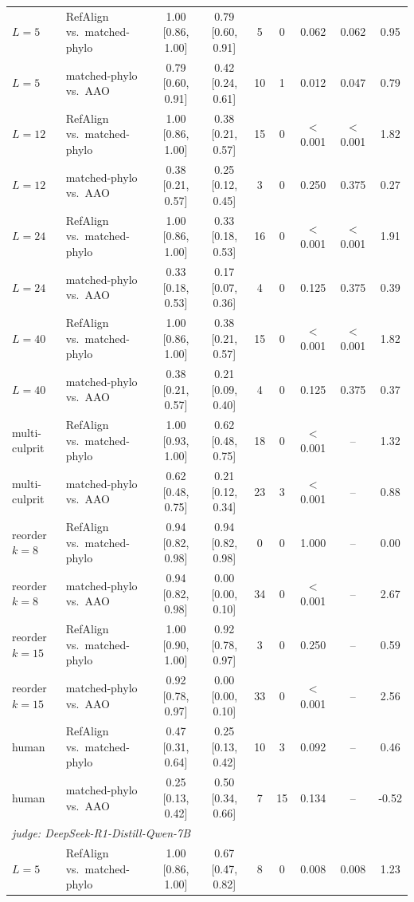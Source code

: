\begin{table}[t]
\begin{tabular}{llccccccc}
$L{=}5$ & RefAlign vs.\ matched-phylo & 1.00 [0.86, 1.00] & 0.79 [0.60, 0.91] & 5 & 0 & 0.062 & 0.062 & 0.95 \\
$L{=}5$ & matched-phylo vs.\ AAO & 0.79 [0.60, 0.91] & 0.42 [0.24, 0.61] & 10 & 1 & 0.012 & 0.047 & 0.79 \\
$L{=}12$ & RefAlign vs.\ matched-phylo & 1.00 [0.86, 1.00] & 0.38 [0.21, 0.57] & 15 & 0 & $<$0.001 & $<$0.001 & 1.82 \\
$L{=}12$ & matched-phylo vs.\ AAO & 0.38 [0.21, 0.57] & 0.25 [0.12, 0.45] & 3 & 0 & 0.250 & 0.375 & 0.27 \\
$L{=}24$ & RefAlign vs.\ matched-phylo & 1.00 [0.86, 1.00] & 0.33 [0.18, 0.53] & 16 & 0 & $<$0.001 & $<$0.001 & 1.91 \\
$L{=}24$ & matched-phylo vs.\ AAO & 0.33 [0.18, 0.53] & 0.17 [0.07, 0.36] & 4 & 0 & 0.125 & 0.375 & 0.39 \\
$L{=}40$ & RefAlign vs.\ matched-phylo & 1.00 [0.86, 1.00] & 0.38 [0.21, 0.57] & 15 & 0 & $<$0.001 & $<$0.001 & 1.82 \\
$L{=}40$ & matched-phylo vs.\ AAO & 0.38 [0.21, 0.57] & 0.21 [0.09, 0.40] & 4 & 0 & 0.125 & 0.375 & 0.37 \\
multi-culprit & RefAlign vs.\ matched-phylo & 1.00 [0.93, 1.00] & 0.62 [0.48, 0.75] & 18 & 0 & $<$0.001 & -- & 1.32 \\
multi-culprit & matched-phylo vs.\ AAO & 0.62 [0.48, 0.75] & 0.21 [0.12, 0.34] & 23 & 3 & $<$0.001 & -- & 0.88 \\
reorder $k{=}8$ & RefAlign vs.\ matched-phylo & 0.94 [0.82, 0.98] & 0.94 [0.82, 0.98] & 0 & 0 & 1.000 & -- & 0.00 \\
reorder $k{=}8$ & matched-phylo vs.\ AAO & 0.94 [0.82, 0.98] & 0.00 [0.00, 0.10] & 34 & 0 & $<$0.001 & -- & 2.67 \\
reorder $k{=}15$ & RefAlign vs.\ matched-phylo & 1.00 [0.90, 1.00] & 0.92 [0.78, 0.97] & 3 & 0 & 0.250 & -- & 0.59 \\
reorder $k{=}15$ & matched-phylo vs.\ AAO & 0.92 [0.78, 0.97] & 0.00 [0.00, 0.10] & 33 & 0 & $<$0.001 & -- & 2.56 \\
human & RefAlign vs.\ matched-phylo & 0.47 [0.31, 0.64] & 0.25 [0.13, 0.42] & 10 & 3 & 0.092 & -- & 0.46 \\
human & matched-phylo vs.\ AAO & 0.25 [0.13, 0.42] & 0.50 [0.34, 0.66] & 7 & 15 & 0.134 & -- & -0.52 \\
\midrule
\multicolumn{9}{l}{\emph{judge: DeepSeek-R1-Distill-Qwen-7B}} \\
$L{=}5$ & RefAlign vs.\ matched-phylo & 1.00 [0.86, 1.00] & 0.67 [0.47, 0.82] & 8 & 0 & 0.008 & 0.008 & 1.23 \\

\end{tabular}
\end{table}
